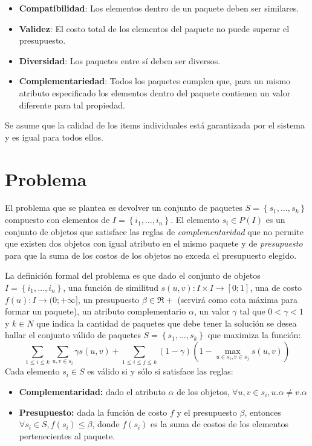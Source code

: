 \begin{itemize}
  \item \textbf{Compatibilidad}: Los elementos dentro de un paquete deben ser similares.
  \item \textbf{Validez}: El costo total de los elementos del paquete no puede superar el presupuesto.
  \item \textbf{Diversidad}: Los paquetes entre sí deben ser diversos.
  \item \textbf{Complementariedad}: Todos los paquetes cumplen que, para un mismo atributo especificado los elementos dentro del paquete contienen un valor diferente para tal propiedad.
\end{itemize}

Se asume que la calidad de los items individuales está garantizada por el sistema y es igual para todos ellos. 

\section{Problema}
El problema que se plantea es devolver un conjunto de paquetes $S = \left\{s_1, \ldots, s_k\right\}$ compuesto con elementos de $I=\left\{i_1,\ldots, i_n\right\}$. El elemento $s_i \in P(I)$ es un conjunto de objetos que satisface las reglas de \textit{complementaridad} que no permite que existen dos objetos con igual atributo en el mismo paquete y de \textit{presupuesto} para que la suma de los costos de los objetos no exceda el presupuesto elegido.

La definición formal del problema es que dado el conjunto de objetos $I=\left\{i_1,\ldots, i_n\right\}$, una función de similitud $s(u,v): I \times I \rightarrow [0;1]$, una de costo $f(u): I \rightarrow (0;+\infty]$, un presupuesto $\beta \in \Re+$ (servirá como cota máxima para formar un paquete), un atributo complementario $\alpha$, un valor $\gamma$ tal que $0 < \gamma < 1$ y $k \in N$ que indica la cantidad de paquetes que debe tener la solución se desea hallar el conjunto válido de paquetes $S = \left\{s_1, \ldots, s_k\right\}$ que maximiza la función:
\begin{equation} \label{des:eq-fnObj}
\sum_{1 \leq i \leq k}{\sum_{u,v \in s_i}{\gamma s(u,v)}} + \sum_{1 \leq i \leq j \leq k}{(1-\gamma) (1-\max_{u \in s_i, v \in s_j}{s(u,v)})}
\end{equation}
Cada elemento $s_i \in S$ es válido si y sólo si satisface las reglas:
\begin{itemize}
	\item \textbf{Complementaridad:} dado el atributo $\alpha$ de los objetos, $\forall u,v \in s_i, u.\alpha \neq v.\alpha$
	\item \textbf{Presupuesto:} dada la función de costo $f$ y el presupuesto $\beta$, entonces $\forall s_i \in S, f(s_i) \leq \beta$, donde $f(s_i)$ es la suma de costos de los elementos pertenecientes al paquete.
\end{itemize}		  

